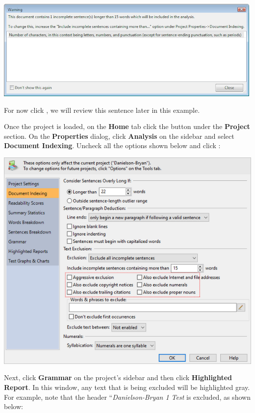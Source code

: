 \documentclass[
]{book}
\theoremstyle{definition}
\theoremstyle{definition}
\theoremstyle{definition}
\theoremstyle{definition}
\theoremstyle{remark}
\begin{document}
\includegraphics{Images/NonGenerated/ExclusionExampleIncompleteSentWarning.png}

For now click , we will review this sentence later in this example.

Once the project is loaded, on the \textbf{Home} tab click the  button under the \textbf{Project} section. On the \textbf{Properties} dialog, click \textbf{Analysis} on the sidebar and select \textbf{Document Indexing}. Uncheck all the options shown below and click :

\includegraphics{Images/ExclusionExampleAllExcluded.png}

Next, click \textbf{Grammar} on the project's sidebar and then click \textbf{Highlighted Report}. In this window, any text that is being excluded will be highlighted gray. For example, note that the header ``\emph{Danielson-Bryan 1 Test} is excluded, as shown below:
\end{document}

